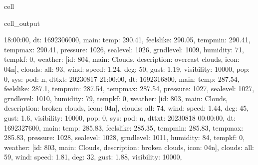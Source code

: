 \documentclass[letterpaper,10pt,english]{jupyterBook}
\begin{document}
\begin{sphinxuseclass}{cell}
\begin{sphinxVerbatimOutput}
\begin{sphinxuseclass}{cell_output}
\begin{sphinxVerbatim}[commandchars=\\\{\}]
18:00:00\PYGZsq{}\PYGZcb{}, \PYGZob{}\PYGZsq{}dt\PYGZsq{}: 1692306000, \PYGZsq{}main\PYGZsq{}: \PYGZob{}\PYGZsq{}temp\PYGZsq{}: 290.41, \PYGZsq{}feels\PYGZus{}like\PYGZsq{}: 290.05, \PYGZsq{}temp\PYGZus{}min\PYGZsq{}: 290.41, \PYGZsq{}temp\PYGZus{}max\PYGZsq{}: 290.41, \PYGZsq{}pressure\PYGZsq{}: 1026, \PYGZsq{}sea\PYGZus{}level\PYGZsq{}: 1026, \PYGZsq{}grnd\PYGZus{}level\PYGZsq{}: 1009, \PYGZsq{}humidity\PYGZsq{}: 71, \PYGZsq{}temp\PYGZus{}kf\PYGZsq{}: 0\PYGZcb{}, \PYGZsq{}weather\PYGZsq{}: [\PYGZob{}\PYGZsq{}id\PYGZsq{}: 804, \PYGZsq{}main\PYGZsq{}: \PYGZsq{}Clouds\PYGZsq{}, \PYGZsq{}description\PYGZsq{}: \PYGZsq{}overcast clouds\PYGZsq{}, \PYGZsq{}icon\PYGZsq{}: \PYGZsq{}04n\PYGZsq{}\PYGZcb{}], \PYGZsq{}clouds\PYGZsq{}: \PYGZob{}\PYGZsq{}all\PYGZsq{}: 93\PYGZcb{}, \PYGZsq{}wind\PYGZsq{}: \PYGZob{}\PYGZsq{}speed\PYGZsq{}: 1.24, \PYGZsq{}deg\PYGZsq{}: 50, \PYGZsq{}gust\PYGZsq{}: 1.19\PYGZcb{}, \PYGZsq{}visibility\PYGZsq{}: 10000, \PYGZsq{}pop\PYGZsq{}: 0, \PYGZsq{}sys\PYGZsq{}: \PYGZob{}\PYGZsq{}pod\PYGZsq{}: \PYGZsq{}n\PYGZsq{}\PYGZcb{}, \PYGZsq{}dt\PYGZus{}txt\PYGZsq{}: \PYGZsq{}2023\PYGZhy{}08\PYGZhy{}17 21:00:00\PYGZsq{}\PYGZcb{}, \PYGZob{}\PYGZsq{}dt\PYGZsq{}: 1692316800, \PYGZsq{}main\PYGZsq{}: \PYGZob{}\PYGZsq{}temp\PYGZsq{}: 287.54, \PYGZsq{}feels\PYGZus{}like\PYGZsq{}: 287.1, \PYGZsq{}temp\PYGZus{}min\PYGZsq{}: 287.54, \PYGZsq{}temp\PYGZus{}max\PYGZsq{}: 287.54, \PYGZsq{}pressure\PYGZsq{}: 1027, \PYGZsq{}sea\PYGZus{}level\PYGZsq{}: 1027, \PYGZsq{}grnd\PYGZus{}level\PYGZsq{}: 1010, \PYGZsq{}humidity\PYGZsq{}: 79, \PYGZsq{}temp\PYGZus{}kf\PYGZsq{}: 0\PYGZcb{}, \PYGZsq{}weather\PYGZsq{}: [\PYGZob{}\PYGZsq{}id\PYGZsq{}: 803, \PYGZsq{}main\PYGZsq{}: \PYGZsq{}Clouds\PYGZsq{}, \PYGZsq{}description\PYGZsq{}: \PYGZsq{}broken clouds\PYGZsq{}, \PYGZsq{}icon\PYGZsq{}: \PYGZsq{}04n\PYGZsq{}\PYGZcb{}], \PYGZsq{}clouds\PYGZsq{}: \PYGZob{}\PYGZsq{}all\PYGZsq{}: 74\PYGZcb{}, \PYGZsq{}wind\PYGZsq{}: \PYGZob{}\PYGZsq{}speed\PYGZsq{}: 1.44, \PYGZsq{}deg\PYGZsq{}: 45, \PYGZsq{}gust\PYGZsq{}: 1.6\PYGZcb{}, \PYGZsq{}visibility\PYGZsq{}: 10000, \PYGZsq{}pop\PYGZsq{}: 0, \PYGZsq{}sys\PYGZsq{}: \PYGZob{}\PYGZsq{}pod\PYGZsq{}: \PYGZsq{}n\PYGZsq{}\PYGZcb{}, \PYGZsq{}dt\PYGZus{}txt\PYGZsq{}: \PYGZsq{}2023\PYGZhy{}08\PYGZhy{}18 00:00:00\PYGZsq{}\PYGZcb{}, \PYGZob{}\PYGZsq{}dt\PYGZsq{}: 1692327600, \PYGZsq{}main\PYGZsq{}: \PYGZob{}\PYGZsq{}temp\PYGZsq{}: 285.83, \PYGZsq{}feels\PYGZus{}like\PYGZsq{}: 285.35, \PYGZsq{}temp\PYGZus{}min\PYGZsq{}: 285.83, \PYGZsq{}temp\PYGZus{}max\PYGZsq{}: 285.83, \PYGZsq{}pressure\PYGZsq{}: 1028, \PYGZsq{}sea\PYGZus{}level\PYGZsq{}: 1028, \PYGZsq{}grnd\PYGZus{}level\PYGZsq{}: 1011, \PYGZsq{}humidity\PYGZsq{}: 84, \PYGZsq{}temp\PYGZus{}kf\PYGZsq{}: 0\PYGZcb{}, \PYGZsq{}weather\PYGZsq{}: [\PYGZob{}\PYGZsq{}id\PYGZsq{}: 803, \PYGZsq{}main\PYGZsq{}: \PYGZsq{}Clouds\PYGZsq{}, \PYGZsq{}description\PYGZsq{}: \PYGZsq{}broken clouds\PYGZsq{}, \PYGZsq{}icon\PYGZsq{}: \PYGZsq{}04n\PYGZsq{}\PYGZcb{}], \PYGZsq{}clouds\PYGZsq{}: \PYGZob{}\PYGZsq{}all\PYGZsq{}: 59\PYGZcb{}, \PYGZsq{}wind\PYGZsq{}: \PYGZob{}\PYGZsq{}speed\PYGZsq{}: 1.81, \PYGZsq{}deg\PYGZsq{}: 32, \PYGZsq{}gust\PYGZsq{}: 1.88\PYGZcb{}, \PYGZsq{}visibility\PYGZsq{}: 10000, 
\end{sphinxVerbatim}
\end{sphinxuseclass}
\end{sphinxVerbatimOutput}
\end{sphinxuseclass}
\end{document}
